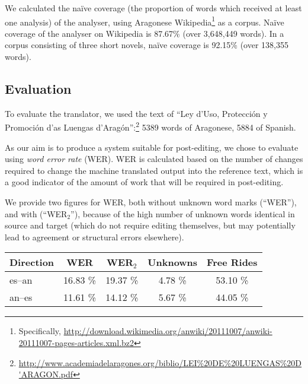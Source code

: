 \documentclass[10pt, a4paper]{article}
\begin{document}
We calculated the naïve coverage (the proportion of words which received at least one analysis) of the analyser, using Aragonese Wikipedia\footnote{Specifically, \url{http://download.wikimedia.org/anwiki/20111007/anwiki-20111007-pages-articles.xml.bz2}} as a corpus. Naïve coverage of the analyser on Wikipedia is 87.67\% (over 3,648,449 words).  In a corpus consisting of three short novels, naïve coverage is 92.15\% (over 138,355 words).
  
  \subsection{Evaluation}
  
  To evaluate the translator, we used the text of ``Ley d'Uso, Protección y Promoción d'as Luengas d'Aragón'':\footnote{\url{http://www.academiadelaragones.org/biblio/LEI\%20DE\%20LUENGAS\%20D'ARAGON.pdf}} 5389 words of Aragonese, 5884 of Spanish.
  
  As our aim is to produce a system suitable for post-editing, we chose to evaluate using \emph{word error rate} (WER). WER is calculated based on the number of changes required to change the machine translated output into the reference text, which is a good indicator of the amount of work that will be required in post-editing.
  
  We provide two figures for WER, both without unknown word marks (``WER''), and with (``WER$_2$''), because of the high number of unknown words identical in source and target (which do not require editing themselves, but may potentially lead to agreement or structural errors elsewhere).
  
  \begin{table*}
  \centering
  \begin{tabular}{|l|c|c|c|c|}
  \hline
  Direction    & WER & WER$_2$ & Unknowns & Free Rides\\
  \hline
  es--an        & 16.83 \% & 19.37 \%  & 4.78 \% & 53.10 \% \\
  an--es        & 11.61 \% & 14.12 \%  & 5.67 \% & 44.05 \% \\
  \hline
  \end{tabular}
    \caption{Evaluation results for both directions. Free rides are those unknown words which
       are identical in both the source and target language. Although they do not cause
       a degradation in translation quality, it is relevant to take them into account when
       evaluating the system. Unknown words are included as an indication of naïve coverage
       over the test sets.
       For brevity, we refer to the languages by their ISO 639-1 codes: {\tt es} for Spanish, and {\tt an} for Aragonese.}
    \label{table:quanteval}
  \end{table*}
  
\end{document}
